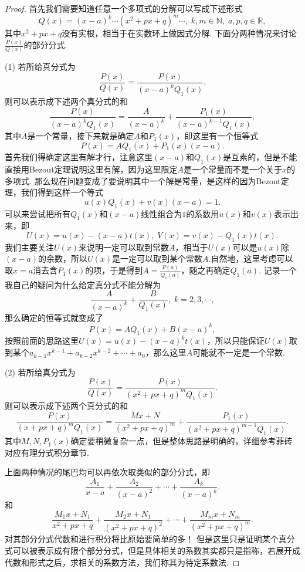 \documentclass{article}
\begin{document}
\begin{proof}
首先我们需要知道任意一个多项式的分解可以写成下述形式
$$
Q(x) = (x-a)^k \cdots (x^2+px+q)^m \cdots,\; k,m \in \mathbb{N},\; a,p,q \in \mathbb{R},
$$
其中$x^2+px+q$没有实根，相当于在实数环上做因式分解. 下面分两种情况来讨论$\frac{P(x)}{Q(x)}$的部分分式. 

{\color{blue}(1)} 若所给真分式为
$$
\frac{P(x)}{Q(x)} = \frac{P(x)}{(x-a)^kQ_1(x)}.
$$
则可以表示成下述两个真分式的和
$$
\frac{P(x)}{(x-a)^kQ_1(x)} = \frac{A}{(x-a)^k} + \frac{P_1(x)}{(x-a)^{k-1}Q_1(x)},
$$
其中$A$是一个常量，接下来就是确定$A$和$P_1(x)$，即这里有一个恒等式
$$
P(x) = AQ_1(x) + P_1(x)(x-a).
$$
首先我们得确定这里有解才行，{\color{blue}注意这里$(x-a)$和$Q_1(x)$是互素的，但是不能直接用Bezout定理说明这里有解，因为这里限定$A$是一个常量而不是一个关于$x$的多项式}. 那么现在问题变成了要说明其中一个解是常量，是这样的因为Bezont定理，我们得到这样一个等式
$$
u(x)Q_1(x) + v(x)(x-a) = 1.
$$
可以来尝试把所有$Q_1(x)$和$(x-a)$线性组合为$1$的系数用$u(x)$和$v(x)$表示出来，即
$$
U(x) = u(x) - (x-a)t(x),\; V(x) = v(x) - Q_1(x)t(x). 
$$
我们主要关注$U(x)$来说明一定可以取到常数$A$，相当于$U(x)$可以是$u(x)$除$(x-a)$的余数，所以$U(x)$是一定可以取到某个常数$A$.自然地，这里考虑可以取$x = a$消去含$P_1(x)$的项，于是得到$A=\frac{P(a)}{Q_1(a)}$，随之再确定$Q_1(a)$. 记录一个我自己的疑问{\color{red}为什么给定真分式不能分解为}
$$
\frac{A}{(x-a)^k} + \frac{B}{Q_1(x)},\; k=2,3,\cdots,
$$
那么确定的恒等式就变成了
$$
P(x) = AQ_1(x) + B(x-a)^k, 
$$
按照前面的思路这里$U(x) = u(x) - (x-a)^kt(x)$，所以只能保证$U(x)$取到某个$a_{k-1}x^{k-1}+a_{k-2}x^{k-2}+\cdots+a_0$，那么这里$A$可能就不一定是一个常数.

{\color{blue}(2)} 若所给真分式为
$$
\frac{P(x)}{Q(x)} = \frac{P(x)}{(x^2+px+q)^mQ_1(x)}.
$$
则可以表示成下述两个真分式的和
$$
\frac{P(x)}{(x+px+q)^mQ_1(x)} = \frac{Mx+N}{(x^2+px+q)^m} + \frac{P_1(x)}{(x^2+px+q)^{m-1}Q_1(x)}.
$$
其中$M,N,P_1(x)$确定要稍微复杂一点，但是整体思路是明确的，详细参考菲砖对应有理分式积分章节.

上面两种情况的尾巴均可以再依次取类似的部分分式，即
$$
\frac{A_1}{x-a} + \frac{A_2}{(x-a)^2} + \cdots + \frac{A_k}{(x-a)^k}.
$$
和
$$
\frac{M_1x+N_1}{x^2+px+q} + \frac{M_2x+N_1}{(x^2+px+q)^2} + \cdots + \frac{M_{m}x+N_{m}}{(x^2+px+q)^m}.
$$
对其部分分式代数和进行积分将比原始要简单的多！ 但是这里只是证明某个真分式可以被表示成有限个部分分式，但是具体相关的系数其实都只是指称，若展开成代数和形式之后，求相关的系数方法，我们称其为{\color{red}待定系数法}.
\end{proof}
\end{document}
